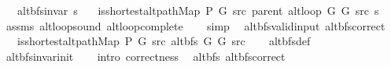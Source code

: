 \begin{isabellebody}
\ \ \ {\isachardoublequoteopen}alt{\isacharunderscore}{\kern0pt}bfs{\isacharunderscore}{\kern0pt}invar{\isacharprime}{\kern0pt}{\isacharprime}{\kern0pt}\ s{\isachardoublequoteclose}\isanewline
\ \ \ {\isachardoublequoteopen}is{\isacharunderscore}{\kern0pt}shortest{\isacharunderscore}{\kern0pt}alt{\isacharunderscore}{\kern0pt}path{\isacharunderscore}{\kern0pt}Map\ P{\isacharprime}{\kern0pt}{\isacharprime}{\kern0pt}\ G\ src\ {\isacharparenleft}{\kern0pt}parent\ {\isacharparenleft}{\kern0pt}alt{\isacharunderscore}{\kern0pt}loop\ G{}\ G{}\ src\ s{\isacharparenright}{\kern0pt}{\isacharparenright}{\kern0pt}{\isachardoublequoteclose}\isanewline
%
\isadelimproof
\ \ %
\endisadelimproof
%
\isatagproof
{}\isamarkupfalse%
\ assms\ alt{\isacharunderscore}{\kern0pt}loop{\isacharunderscore}{\kern0pt}sound\ alt{\isacharunderscore}{\kern0pt}loop{\isacharunderscore}{\kern0pt}complete\isanewline
\ \ \isamarkupfalse%
\ simp%
\endisatagproof
{\isafoldproof}%
%
\isadelimproof
\isanewline
%
\endisadelimproof
\isanewline
{}\isamarkupfalse%
\ {\isacharparenleft}{\kern0pt}\ alt{\isacharunderscore}{\kern0pt}bfs{\isacharunderscore}{\kern0pt}valid{\isacharunderscore}{\kern0pt}input{\isacharparenright}{\kern0pt}\ alt{\isacharunderscore}{\kern0pt}bfs{\isacharunderscore}{\kern0pt}correct{\isacharcolon}{\kern0pt}\isanewline
\ \ \ {\isachardoublequoteopen}is{\isacharunderscore}{\kern0pt}shortest{\isacharunderscore}{\kern0pt}alt{\isacharunderscore}{\kern0pt}path{\isacharunderscore}{\kern0pt}Map\ P{\isacharprime}{\kern0pt}{\isacharprime}{\kern0pt}\ G\ src\ {\isacharparenleft}{\kern0pt}alt{\isacharunderscore}{\kern0pt}bfs\ G{}\ G{}\ src{\isacharparenright}{\kern0pt}{\isachardoublequoteclose}\isanewline
%
\isadelimproof
\ \ %
\endisadelimproof
%
\isatagproof
{}\isamarkupfalse%
\ alt{\isacharunderscore}{\kern0pt}bfs{\isacharunderscore}{\kern0pt}def\isanewline
\ \ \isamarkupfalse%
\ alt{\isacharunderscore}{\kern0pt}bfs{\isacharunderscore}{\kern0pt}invar{\isacharunderscore}{\kern0pt}init\isanewline
\ \ \isamarkupfalse%
\ {\isacharparenleft}{\kern0pt}intro\ correctness{\isacharparenright}{\kern0pt}%
\endisatagproof
{\isafoldproof}%
%
\isadelimproof
\isanewline
%
\endisadelimproof
\isanewline
{}\isamarkupfalse%
\ {\isacharparenleft}{\kern0pt}\ alt{\isacharunderscore}{\kern0pt}bfs{\isacharparenright}{\kern0pt}\ alt{\isacharunderscore}{\kern0pt}bfs{\isacharunderscore}{\kern0pt}correct{\isacharcolon}{\kern0pt}\isanewline

\end{isabellebody}
